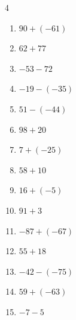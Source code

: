 \begin{multicols}{4}
\begin{enumerate}
        \phantom{$=-31$}

  \item $90+(-61)$

        \phantom{$=29$}

  \item $62+77$

        \phantom{$=139$}

  \item $-53-72$

        \phantom{$=-125$}

  \item $-19-(-35)$

        \phantom{$=16$}

  \item $51-(-44)$

        \phantom{$=95$}

  \item $98+20$

        \phantom{$=118$}

  \item $7+(-25)$

        \phantom{$=-18$}

  \item $58+10$

        \phantom{$=68$}

  \item $16+(-5)$

        \phantom{$=11$}

  \item $91+3$

        \phantom{$=94$}

  \item $-87+(-67)$

        \phantom{$=-154$}

  \item $55+18$

        \phantom{$=73$}

\columnbreak %

\resetques

  \item $-42-(-75)$

        \phantom{$=33$}

  \item $59+(-63)$

        \phantom{$=-4$}

  \item $-7-5$

        \phantom{$=-12$}


\end{enumerate}
\end{multicols}
